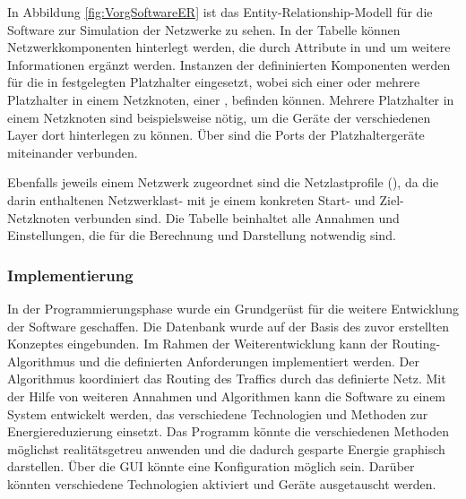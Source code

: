 In Abbildung \ref{fig:VorgSoftwareER} ist das Entity-Relationship-Modell für die Software zur Simulation der Netzwerke zu sehen. In der Tabelle  können Netzwerkkomponenten hinterlegt werden, die durch Attribute in  und  um weitere Informationen ergänzt werden. Instanzen der defininierten Komponenten werden für die in  festgelegten Platzhalter eingesetzt, wobei sich einer oder mehrere Platzhalter in einem Netzknoten, einer , befinden können. Mehrere Platzhalter in einem Netzknoten sind beispielsweise nötig, um die Geräte der verschiedenen Layer dort hinterlegen zu können. Über  sind die Ports der Platzhaltergeräte miteinander verbunden.

Ebenfalls jeweils einem Netzwerk zugeordnet sind die Netzlastprofile (), da die darin enthaltenen Netzwerklast- mit je einem konkreten Start- und Ziel-Netzknoten verbunden sind. Die Tabelle  beinhaltet alle Annahmen und Einstellungen, die für die Berechnung und Darstellung notwendig sind. 

\subsubsection{Implementierung}
In der Programmierungsphase wurde ein Grundgerüst für die weitere Entwicklung der Software geschaffen. Die Datenbank wurde auf der Basis des zuvor erstellten Konzeptes eingebunden. Im Rahmen der Weiterentwicklung kann der Routing-Algorithmus und die definierten Anforderungen implementiert werden. Der Algorithmus koordiniert das Routing des Traffics durch das definierte Netz. Mit der Hilfe von weiteren Annahmen und Algorithmen kann die Software zu einem System entwickelt werden, das verschiedene Technologien und Methoden zur Energiereduzierung einsetzt. Das Programm könnte die verschiedenen Methoden möglichst realitätsgetreu anwenden und die dadurch gesparte Energie graphisch darstellen. Über die GUI könnte eine Konfiguration möglich sein.  Darüber könnten verschiedene Technologien aktiviert und Geräte ausgetauscht werden. 

